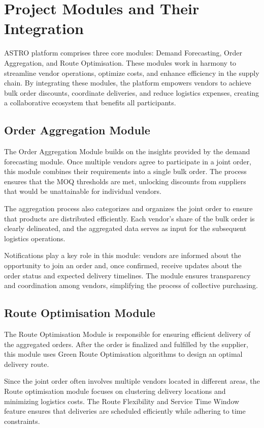 \section{Project Modules and Their Integration}

ASTRO platform comprises three core modules: Demand Forecasting, Order Aggregation, and Route Optimisation. These modules work in harmony to streamline vendor operations, optimize costs, and enhance efficiency in the supply chain. By integrating these modules, the platform empowers vendors to achieve bulk order discounts, coordinate deliveries, and reduce logistics expenses, creating a collaborative ecosystem that benefits all participants.


\subsection{Order Aggregation Module}

The Order Aggregation Module builds on the insights provided by the demand forecasting module. Once multiple vendors agree to participate in a joint order, this module combines their requirements into a single bulk order. The process ensures that the MOQ thresholds are met, unlocking discounts from suppliers that would be unattainable for individual vendors.

The aggregation process also categorizes and organizes the joint order to ensure that products are distributed efficiently. Each vendor's share of the bulk order is clearly delineated, and the aggregated data serves as input for the subsequent logistics operations.

Notifications play a key role in this module: vendors are informed about the opportunity to join an order and, once confirmed, receive updates about the order status and expected delivery timelines. The module ensures transparency and coordination among vendors, simplifying the process of collective purchasing.

\subsection{Route Optimisation Module}

The Route Optimisation Module is responsible for ensuring efficient delivery of the aggregated orders. After the order is finalized and fulfilled by the supplier, this module uses Green Route Optimisation algorithms to design an optimal delivery route.

Since the joint order often involves multiple vendors located in different areas, the Route optimisation module focuses on clustering delivery locations and minimizing logistics costs. The Route Flexibility and Service Time Window feature ensures that deliveries are scheduled efficiently while adhering to time constraints.

